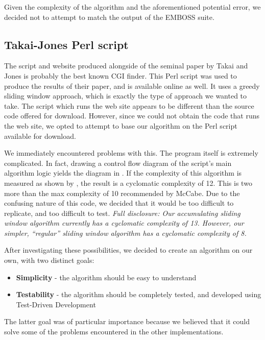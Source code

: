 \documentclass{bioinfo}
\begin{document}
Given the complexity of the algorithm and the aforementioned potential
error, we decided not to attempt to match the output of the EMBOSS
suite.

\subsection{Takai-Jones Perl script}

The script and website produced alongside of the seminal paper by
Takai and Jones is probably the best known CGI finder. This Perl script was
used to produce the results of their paper, and is available online as
well. It uses a greedy sliding
window approach, which is exactly the type of approach we wanted to
take. The script which runs the web site appears to be different than
the source code offered for download. However, since we could not obtain
the code that runs the web site, we opted to attempt to base our
algorithm on the Perl script available for download.

We immediately encountered problems with this. The program itself is
extremely complicated. In fact, drawing a control flow diagram of the
script's main algorithm logic yields the diagram in
. If the complexity of this algorithm is
measured as shown by \cite{McCabe:1976:CM:1313324.1313586}, the result
is a cyclomatic complexity of 12. This is two more than the max
complexity of 10 recommended by McCabe. Due to the confusing nature of
this code, we decided that it would be too difficult to replicate, and
too difficult to test. \textit{Full disclosure: Our accumulating
  sliding window algorithm currently has a cyclomatic complexity of
  13. However, our simpler, ``regular'' sliding window algorithm has a
  cyclomatic complexity of 8.}

After investigating these possibilities, we decided to create an
algorithm on our own, with two distinct goals:

\begin{itemize}
\item \textbf{Simplicity} - the algorithm should be easy to understand
\item \textbf{Testability} - the algorithm should be completely tested, and
  developed using Test-Driven Development
\end{itemize}

The latter goal was of particular importance because we believed that
it could solve some of the problems encountered in the other
implementations.
\end{document}
